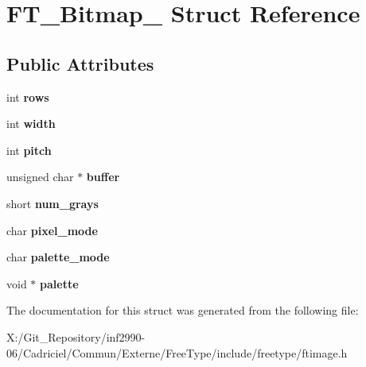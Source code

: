 \hypertarget{struct_f_t___bitmap__}{\section{F\-T\-\_\-\-Bitmap\-\_\- Struct Reference}
\label{struct_f_t___bitmap__}
}
\subsection*{Public Attributes}
\begin{DoxyCompactItemize}
\item 
\hypertarget{struct_f_t___bitmap___a1b6bb20b30fe087e3fc87a0eb37730c0}{int {\bfseries rows}}\label{struct_f_t___bitmap___a1b6bb20b30fe087e3fc87a0eb37730c0}

\item 
\hypertarget{struct_f_t___bitmap___a7b5e6252dd91a3809fe80ebbeb6720eb}{int {\bfseries width}}\label{struct_f_t___bitmap___a7b5e6252dd91a3809fe80ebbeb6720eb}

\item 
\hypertarget{struct_f_t___bitmap___afdee595846e1188c7a76d0cec9d85cf2}{int {\bfseries pitch}}\label{struct_f_t___bitmap___afdee595846e1188c7a76d0cec9d85cf2}

\item 
\hypertarget{struct_f_t___bitmap___a76439b1d3c13b81ca506108cd1623284}{unsigned char $\ast$ {\bfseries buffer}}\label{struct_f_t___bitmap___a76439b1d3c13b81ca506108cd1623284}

\item 
\hypertarget{struct_f_t___bitmap___a415d78060f8012d312703c9792ec005a}{short {\bfseries num\-\_\-grays}}\label{struct_f_t___bitmap___a415d78060f8012d312703c9792ec005a}

\item 
\hypertarget{struct_f_t___bitmap___a5cc5e0fe42a93a86e16706ad52e087a2}{char {\bfseries pixel\-\_\-mode}}\label{struct_f_t___bitmap___a5cc5e0fe42a93a86e16706ad52e087a2}

\item 
\hypertarget{struct_f_t___bitmap___ae7c8c74255cd27873b12a360cd5f3884}{char {\bfseries palette\-\_\-mode}}\label{struct_f_t___bitmap___ae7c8c74255cd27873b12a360cd5f3884}

\item 
\hypertarget{struct_f_t___bitmap___a8d5ecf4409f71bfb559e0d13d8df4d86}{void $\ast$ {\bfseries palette}}\label{struct_f_t___bitmap___a8d5ecf4409f71bfb559e0d13d8df4d86}

\end{DoxyCompactItemize}


The documentation for this struct was generated from the following file\-:\begin{DoxyCompactItemize}
\item 
X\-:/\-Git\-\_\-\-Repository/inf2990-\/06/\-Cadriciel/\-Commun/\-Externe/\-Free\-Type/include/freetype/ftimage.\-h\end{DoxyCompactItemize}
